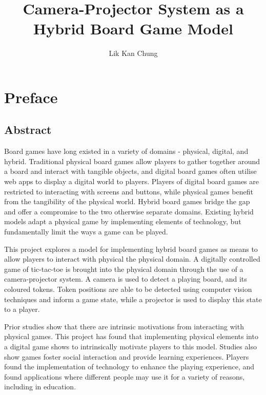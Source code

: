 \documentclass[12pt]{article}
\title{Camera-Projector System as a Hybrid Board Game Model}
\author{Lik Kan Chung}
\begin{document}
\maketitle

\tableofcontents
\listoffigures

\setcounter{section}{-1}
\section{Preface}
\subsection{Abstract}

Board games have long existed in a variety of domains - physical, digital, and hybrid. 
Traditional physical board games allow players to gather together around a board and interact with tangible objects, and digital board games often utilise web apps to display a digital world to players. 
Players of digital board games are restricted to interacting with screens and buttons, while physical games benefit from the tangibility of the physical world. Hybrid board games bridge the gap and offer a compromise to the two otherwise separate domains. Existing hybrid models adapt a physical game by implementing elements of technology, but fundamentally limit the ways a game can be played. 

This project explores a model for implementing hybrid board games as means to allow players to interact with physical the physical domain. A digitally controlled game of tic-tac-toe is brought into the physical domain through the use of a camera-projector system. A camera is used to detect a playing board, and its coloured tokens. Token positions are able to be detected using computer vision techniques and inform a game state, while a projector is used to display this state to a player. 

Prior studies show that there are intrinsic motivations from interacting with physical games. This project has found that implementing physical elements into a digital game shows to intrinsically motivate players to this model. Studies also show games foster social interaction and provide learning experiences. Players found the implementation of technology to enhance the playing experience, and found applications where different people may use it for a variety of reasons, including in education. 
\end{document}
